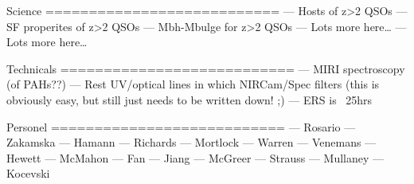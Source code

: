 \documentclass[11pt,epsf]{article}
\begin{document}
\begin{multicols}{3}[]

\end{multicols}


Science
===========================
— Hosts of z>2 QSOs
— SF properites of z>2 QSOs
— Mbh-Mbulge for z>2 QSOs
— Lots more here… 
— Lots more here… 


Technicals 
===========================
— MIRI spectroscopy (of PAHs??) 
— Rest UV/optical lines in which NIRCam/Spec filters (this is obviously easy, but still just needs to be written down! ;) 
— ERS is ~25hrs 


Personel
===========================
— Rosario
— Zakamska
— Hamann
— Richards
— Mortlock
— Warren 
— Venemans 
— Hewett 
— McMahon
— Fan
— Jiang
— McGreer
— Strauss
— Mullaney
— Kocevski
\end{document}
